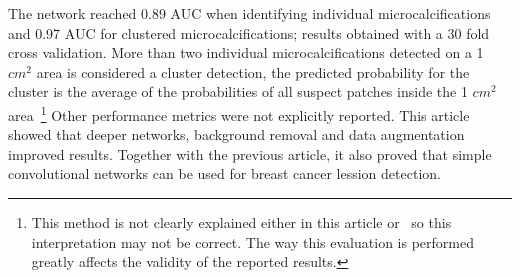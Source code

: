 The network reached 0.89 AUC when identifying individual microcalcifications and 0.97 AUC for clustered microcalcifications; results obtained with a 30 fold cross validation. More than two individual microcalcifications detected on a 1 $cm^2$ area is considered a cluster detection, the predicted probability for the cluster is the average of the probabilities of all suspect patches inside the 1 $cm^2$ area~\footnote{This method is not clearly explained either in this article or~\cite{Lo1998} so this interpretation may not be correct. The way this evaluation is performed greatly affects the validity of the reported results.} Other performance metrics were not explicitly reported.
This article showed that deeper networks, background removal and data augmentation improved results. Together with the previous article, it also proved that simple convolutional networks can be used for breast cancer lession detection. 




